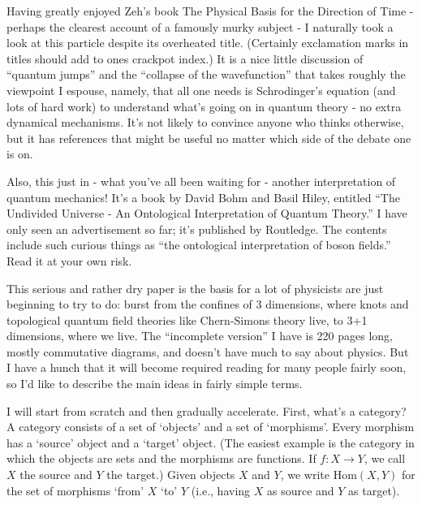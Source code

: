 \documentclass{article}
\def\tightlist{}
\renewcommand{\texttt}[1]{%
  \begingroup
  \ttfamily
  \begingroup\lccode`~=`/\lowercase{\endgroup\def~}{/\discretionary{}{}{}}%
  \begingroup\lccode`~=`[\lowercase{\endgroup\def~}{[\discretionary{}{}{}}%
  \begingroup\lccode`~=`.\lowercase{\endgroup\def~}{.\discretionary{}{}{}}%
  \catcode`/=\active\catcode`[=\active\catcode`.=\active
  \scantokens{#1\noexpand}%
  \endgroup
}
\begin{document}
Having greatly enjoyed Zeh's book The Physical Basis for the Direction
of Time - perhaps the clearest account of a famously murky subject - I
naturally took a look at this particle despite its overheated title.
(Certainly exclamation marks in titles should add to ones crackpot
index.) It is a nice little discussion of ``quantum jumps'' and the
``collapse of the wavefunction'' that takes roughly the viewpoint I
espouse, namely, that all one needs is Schrodinger's equation (and lots
of hard work) to understand what's going on in quantum theory - no extra
dynamical mechanisms. It's not likely to convince anyone who thinks
otherwise, but it has references that might be useful no matter which
side of the debate one is on.

Also, this just in - what you've all been waiting for - another
interpretation of quantum mechanics! It's a book by David Bohm and Basil
Hiley, entitled ``The Undivided Universe - An Ontological Interpretation
of Quantum Theory.'' I have only seen an advertisement so far; it's
published by Routledge. The contents include such curious things as
``the ontological interpretation of boson fields.'' Read it at your own
risk.


This serious and rather dry paper is the basis for a lot of physicists
are just beginning to try to do: burst from the confines of 3
dimensions, where knots and topological quantum field theories like
Chern-Simons theory live, to 3+1 dimensions, where we live. The
``incomplete version'' I have is 220 pages long, mostly commutative
diagrams, and doesn't have much to say about physics. But I have a hunch
that it will become required reading for many people fairly soon, so I'd
like to describe the main ideas in fairly simple terms.

I will start from scratch and then gradually accelerate. First, what's a
category? A category consists of a set of `objects' and a set of
`morphisms'. Every morphism has a `source' object and a `target' object.
(The easiest example is the category in which the objects are sets and
the morphisms are functions. If \(f\colon X\to Y\), we call \(X\) the
source and \(Y\) the target.) Given objects \(X\) and \(Y\), we write
\(\mathrm{Hom}(X,Y)\) for the set of morphisms `from' \(X\) `to' \(Y\)
(i.e., having \(X\) as source and \(Y\) as target).
\end{document}
